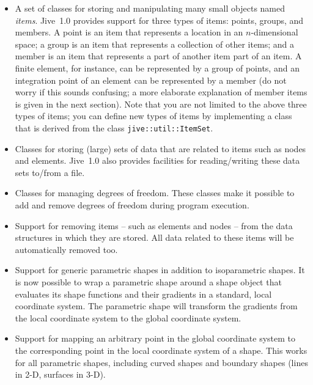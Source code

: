 \documentclass[a4paper,11pt]{article}
\newcommand{\Code}[1]{\texttt{#1}}
\begin{document}
\begin{itemize}

\item A set of classes for storing and manipulating many small objects
  named \emph{items}. Jive~1.0 provides support for three types of
  items: points, groups, and members. A point is an item that
  represents a location in an $n$-dimensional space; a group is an
  item that represents a collection of other items; and a member is an
  item that represents a part of another item part of an item. A
  finite element, for instance, can be represented by a group of
  points, and an integration point of an element can be represented by
  a member (do not worry if this sounds confusing; a more elaborate
  explanation of member items is given in the next section). Note that
  you are not limited to the above three types of items; you can
  define new types of items by implementing a class that is derived
  from the class \Code{jive::\-util\-::ItemSet}.

\item Classes for storing (large) sets of data that are related to
  items such as nodes and elements. Jive~1.0 also provides facilities
  for reading/writing these data sets to/from a file.

\item Classes for managing degrees of freedom. These classes make it
  possible to add and remove degrees of freedom during program
  execution.

\item Support for removing items -- such as elements and nodes -- from
  the data structures in which they are stored. All data related to
  these items will be automatically removed too.

\item Support for generic parametric shapes in addition to
  isoparametric shapes. It is now possible to wrap a parametric shape
  around a shape object that evaluates its shape functions and their
  gradients in a standard, local coordinate system. The parametric
  shape will transform the gradients from the local coordinate system
  to the global coordinate system.

\item Support for mapping an arbitrary point in the global coordinate
  system to the corresponding point in the local coordinate system of
  a shape. This works for all parametric shapes, including curved
  shapes and boundary shapes (lines in 2-D, surfaces in 3-D).


\end{itemize}
\end{document}
